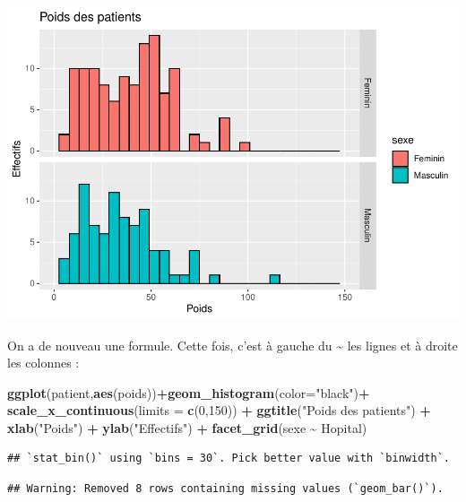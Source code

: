 \documentclass[
]{book}
\newenvironment{Shaded}{\begin{snugshade}}{\end{snugshade}}
\newcommand{\AttributeTok}[1]{\textcolor[rgb]{0.13,0.29,0.53}{#1}}
\newcommand{\DecValTok}[1]{\textcolor[rgb]{0.00,0.00,0.81}{#1}}
\newcommand{\FunctionTok}[1]{\textcolor[rgb]{0.13,0.29,0.53}{\textbf{#1}}}
\newcommand{\NormalTok}[1]{#1}
\newcommand{\SpecialCharTok}[1]{\textcolor[rgb]{0.81,0.36,0.00}{\textbf{#1}}}
\newcommand{\StringTok}[1]{\textcolor[rgb]{0.31,0.60,0.02}{#1}}
\begin{document}
\includegraphics{_main_files/figure-latex/ggplot9-1.pdf}

On a de nouveau une formule. Cette fois, c'est à gauche du \textasciitilde{} les lignes et
à droite les colonnes :

\begin{Shaded}
\begin{Highlighting}[]
\FunctionTok{ggplot}\NormalTok{(patient,}\FunctionTok{aes}\NormalTok{(poids))}\SpecialCharTok{+}\FunctionTok{geom\_histogram}\NormalTok{(}\AttributeTok{color=}\StringTok{"black"}\NormalTok{)}\SpecialCharTok{+}
  \FunctionTok{scale\_x\_continuous}\NormalTok{(}\AttributeTok{limits =} \FunctionTok{c}\NormalTok{(}\DecValTok{0}\NormalTok{,}\DecValTok{150}\NormalTok{)) }\SpecialCharTok{+} 
  \FunctionTok{ggtitle}\NormalTok{(}\StringTok{"Poids des patients"}\NormalTok{) }\SpecialCharTok{+} 
  \FunctionTok{xlab}\NormalTok{(}\StringTok{"Poids"}\NormalTok{) }\SpecialCharTok{+} 
  \FunctionTok{ylab}\NormalTok{(}\StringTok{"Effectifs"}\NormalTok{) }\SpecialCharTok{+}
  \FunctionTok{facet\_grid}\NormalTok{(sexe }\SpecialCharTok{\textasciitilde{}}\NormalTok{ Hopital)}
\end{Highlighting}
\end{Shaded}

\begin{verbatim}
## `stat_bin()` using `bins = 30`. Pick better value with `binwidth`.
\end{verbatim}

\begin{verbatim}
## Warning: Removed 8 rows containing missing values (`geom_bar()`).
\end{verbatim}
\end{document}
